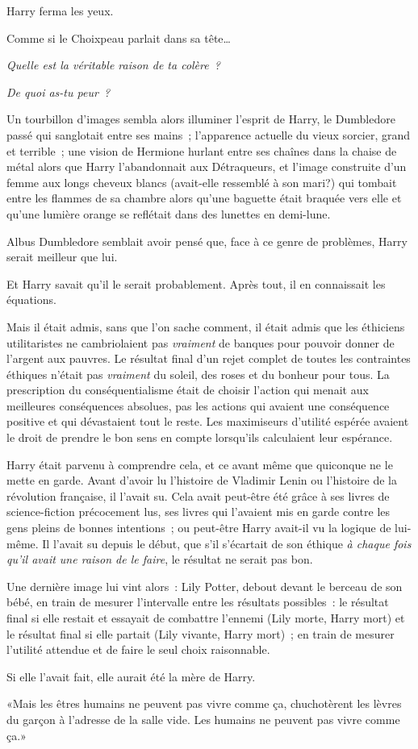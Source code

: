 Harry ferma les yeux.

Comme si le Choixpeau parlait dans sa tête…

\emph{Quelle est la véritable raison de ta colère~?}

\emph{De quoi as-tu peur~?}

Un tourbillon d'images sembla alors illuminer l'esprit de Harry, le Dumbledore passé qui sanglotait entre ses mains~; l'apparence actuelle du vieux sorcier, grand et terrible~; une vision de Hermione hurlant entre ses chaînes dans la chaise de métal alors que Harry l'abandonnait aux Détraqueurs, et l'image construite d'un femme aux longs cheveux blancs (avait-elle ressemblé à son mari?) qui tombait entre les flammes de sa chambre alors qu'une baguette était braquée vers elle et qu'une lumière orange se reflétait dans des lunettes en demi-lune.

Albus Dumbledore semblait avoir pensé que, face à ce genre de problèmes, Harry serait meilleur que lui.

Et Harry savait qu'il le serait probablement. Après tout, il en connaissait les équations.

Mais il était admis, sans que l'on sache comment, il était admis que les éthiciens utilitaristes ne cambriolaient pas \emph{vraiment} de banques pour pouvoir donner de l'argent aux pauvres. Le résultat final d'un rejet complet de toutes les contraintes éthiques n'était pas \emph{vraiment} du soleil, des roses et du bonheur pour tous. La prescription du conséquentialisme était de choisir l'action qui menait aux meilleures conséquences absolues, pas les actions qui avaient une conséquence positive et qui dévastaient tout le reste. Les maximiseurs d'utilité espérée avaient le droit de prendre le bon sens en compte lorsqu'ils calculaient leur espérance.

Harry était parvenu à comprendre cela, et ce avant même que quiconque ne le mette en garde. Avant d'avoir lu l'histoire de Vladimir Lenin ou l'histoire de la révolution française, il l'avait su. Cela avait peut-être été grâce à ses livres de science-fiction précocement lus, ses livres qui l'avaient mis en garde contre les gens pleins de bonnes intentions~; ou peut-être Harry avait-il vu la logique de lui-même. Il l'avait su depuis le début, que s'il s'écartait de son éthique \emph{à chaque fois qu'il avait une raison de le faire}, le résultat ne serait pas bon.

Une dernière image lui vint alors~: Lily Potter, debout devant le berceau de son bébé, en train de mesurer l'intervalle entre les résultats possibles~: le résultat final si elle restait et essayait de combattre l'ennemi (Lily morte, Harry mort) et le résultat final si elle partait (Lily vivante, Harry mort)~; en train de mesurer l'utilité attendue et de faire le seul choix raisonnable.

Si elle l'avait fait, elle aurait été la mère de Harry.

«Mais les êtres humains ne peuvent pas vivre comme ça, chuchotèrent les lèvres du garçon à l'adresse de la salle vide. Les humains ne peuvent pas vivre comme ça.» 

